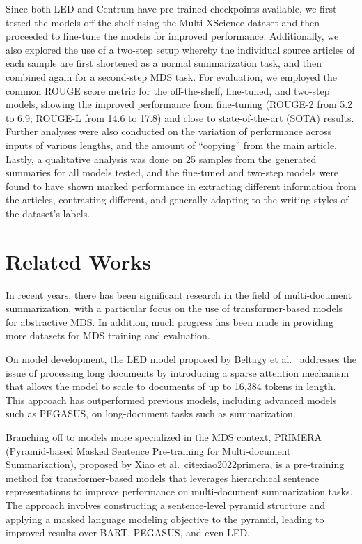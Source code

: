 \documentclass[12pt, twocolumn]{article}
\numberwithin{equation}{section}
\begin{document}
Since both LED and Centrum have pre-trained checkpoints available, we first tested the models off-the-shelf using the Multi-XScience dataset and then proceeded to fine-tune the models for improved performance.  Additionally, we also explored the use of a two-step setup whereby the individual source articles of each sample are first shortened as a normal summarization task, and then combined again for a second-step MDS task.  For evaluation, we employed the common ROUGE score metric for the off-the-shelf, fine-tuned, and two-step models, showing the improved performance from fine-tuning (ROUGE-2 from 5.2 to 6.9; ROUGE-L from 14.6 to 17.8) and close to state-of-the-art (SOTA) results.  Further analyses were also conducted on the variation of performance across inputs of various lengths, and the amount of ``copying'' from the main article.  Lastly, a qualitative analysis was done on 25 samples from the generated summaries for all models tested, and the fine-tuned and two-step models were found to have shown marked performance in extracting different information from the articles, contrasting different, and generally adapting to the writing styles of the dataset’s labels.

\section{Related Works}
\label{sec:relatedworks}

In recent years, there has been significant research in the field of multi-document summarization, with a particular focus on the use of transformer-based models for abstractive MDS. In addition, much progress has been made in providing more datasets for MDS training and evaluation.

On model development, the LED model proposed by Beltagy et al.~\cite{beltagy2020longformer} addresses the issue of processing long documents by introducing a sparse attention mechanism that allows the model to scale to documents of up to 16,384 tokens in length. This approach has outperformed previous models, including advanced models such as PEGASUS, on long-document tasks such as summarization.

Branching off to models more specialized in the MDS context, PRIMERA (Pyramid-based Masked Sentence Pre-training for Multi-document Summarization), proposed by Xiao et al.~cite{xiao2022primera}, is a pre-training method for transformer-based models that leverages hierarchical sentence representations to improve performance on multi-document summarization tasks. The approach involves constructing a sentence-level pyramid structure and applying a masked language modeling objective to the pyramid, leading to improved results over BART, PEGASUS, and even LED.
\end{document}
